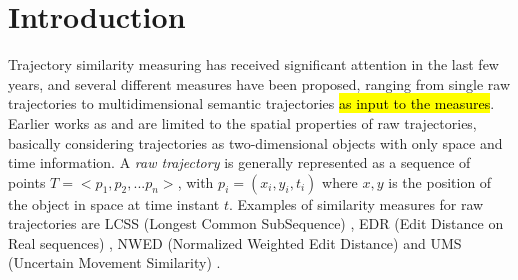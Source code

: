 \documentclass[12pt]{article}
\providecommand{\keywords}[1]
{
  \small    
  \textbf{\textit{Keywords---}} #1
}
\begin{document}
 




\section{Introduction}
Trajectory similarity measuring has received significant attention in the last few years, and several different measures have been proposed, ranging from single raw trajectories to multidimensional semantic trajectories {\hl{as input to the measures}}. Earlier works as \cite{vlachos2002discovering} and \cite{Chen:2005:RFS:1066157.1066213} are limited to the spatial properties of raw trajectories, basically considering trajectories as two-dimensional objects with only space and time information. A \emph{raw trajectory} is generally represented as a sequence of points $T=<p_1, p_2, ...p_n>$, with $p_i=(x_i,y_i,t_i)$ where $x,y$ is the position of the object in space at time instant $t$. Examples of similarity measures for raw trajectories are LCSS (Longest Common SubSequence) \cite{vlachos2002discovering}, EDR (Edit Distance on Real sequences) \cite{Chen:2005:RFS:1066157.1066213}, NWED (Normalized Weighted Edit Distance) \cite{dodge2012} and UMS (Uncertain Movement Similarity) \cite{Furtado-UMS-2018}.
\end{document}
